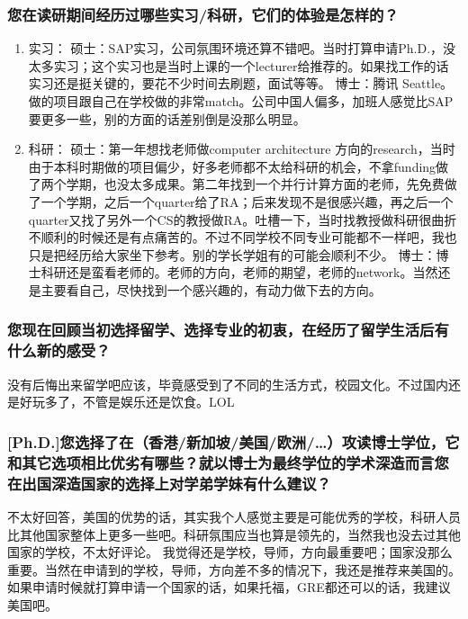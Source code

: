 \documentclass[a4paper,UTF8]{book}
\begin{document}
    \subsubsection*{您在读研期间经历过哪些实习/科研，它们的体验是怎样的？}
        \begin{enumerate}[itemindent=0pt,itemsep=0pt,parsep=0pt]
            \item 实习：
            硕士：SAP实习，公司氛围环境还算不错吧。当时打算申请Ph.D.，没太多实习；这个实习也是当时上课的一个lecturer给推荐的。如果找工作的话实习还是挺关键的，要花不少时间去刷题，面试等等。
            博士：腾讯 Seattle。做的项目跟自己在学校做的非常match。公司中国人偏多，加班人感觉比SAP要更多一些，别的方面的话差别倒是没那么明显。
            \item 科研：
            硕士：第一年想找老师做computer architecture 方向的research，当时由于本科时期做的项目偏少，好多老师都不太给科研的机会，不拿funding做了两个学期，也没太多成果。第二年找到一个并行计算方面的老师，先免费做了一个学期，之后一个quarter给了RA；后来发现不是很感兴趣，再之后一个quarter又找了另外一个CS的教授做RA。吐槽一下，当时找教授做科研很曲折不顺利的时候还是有点痛苦的。不过不同学校不同专业可能都不一样吧，我也只是把经历给大家坐下参考。别的学长学姐有的可能会顺利不少。
            博士：博士科研还是蛮看老师的。老师的方向，老师的期望，老师的network。当然还是主要看自己，尽快找到一个感兴趣的，有动力做下去的方向。
        \end{enumerate}
    \subsubsection*{您现在回顾当初选择留学、选择专业的初衷，在经历了留学生活后有什么新的感受？}
    没有后悔出来留学吧应该，毕竟感受到了不同的生活方式，校园文化。不过国内还是好玩多了，不管是娱乐还是饮食。LOL
    \subsubsection*{[Ph.D.]您选择了在（香港/新加坡/美国/欧洲/…）攻读博士学位，它和其它选项相比优劣有哪些？就以博士为最终学位的学术深造而言您在出国深造国家的选择上对学弟学妹有什么建议？}
    不太好回答，美国的优势的话，其实我个人感觉主要是可能优秀的学校，科研人员比其他国家整体上更多一些吧。科研氛围应当也算是领先的，当然我也没去过其他国家的学校，不太好评论。
    我觉得还是学校，导师，方向最重要吧；国家没那么重要。当然在申请到的学校，导师，方向差不多的情况下，我还是推荐来美国的。如果申请时候就打算申请一个国家的话，如果托福，GRE都还可以的话，我建议美国吧。
\end{document}
